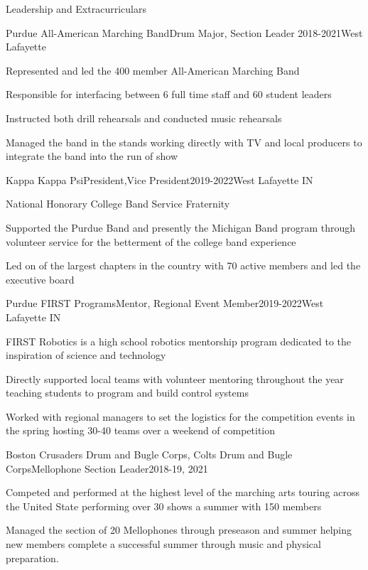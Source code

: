 \documentclass[]{jheidegger-resume}
\begin{document}
\begin{section}{Leadership and Extracurriculars} 
    \begin{subsection}{Purdue All-American Marching Band}{Drum Major, Section Leader} {2018-2021}{West Lafayette}
        \item Represented and led the 400 member All-American Marching Band 
        \item Responsible for interfacing between 6 full time staff and 60 student leaders
        \item Instructed both drill rehearsals and conducted music rehearsals
        \item Managed the band in the stands working directly with TV and local producers to integrate the band into the run of show 
    \end{subsection}
    \begin{subsection}{Kappa Kappa Psi}{President,Vice President}{2019-2022}{West Lafayette IN}
        \item National Honorary College Band Service Fraternity
        \item Supported the Purdue Band and presently the Michigan Band program through volunteer service for the betterment of the college band experience
        \item Led on of the largest chapters in the country with 70 active members and led the executive board 
    \end{subsection}
    \begin{subsection}{Purdue FIRST Programs}{Mentor, Regional Event Member}{2019-2022}{West Lafayette IN}
        \item FIRST Robotics is a high school robotics mentorship program dedicated to the inspiration of science and technology
        \item Directly supported local teams with volunteer mentoring throughout the year teaching students to program and build control systems
        \item Worked with regional managers to set the logistics for the competition events in the spring hosting 30-40 teams over a weekend of competition
    \end{subsection}
    \begin{subsection}{Boston Crusaders Drum and Bugle Corps, Colts Drum and Bugle Corps}{Mellophone Section Leader}{2018-19, 2021}{}
        \item Competed and performed at the highest level of the marching arts touring across the United State performing over 30 shows a summer with 150 members
        \item Managed the section of 20 Mellophones through preseason and summer helping new members complete a successful summer through music and physical preparation.
    \end{subsection}
\end{section}
\end{document}
